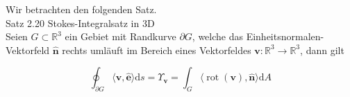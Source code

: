 \documentclass[10pt]{article}
\begin{document}
Wir betrachten den folgenden Satz.\\
Satz 2.20 Stokes-Integralsatz in 3D\\
Seien $G \subset \mathbb{R}^{3}$ ein Gebiet mit Randkurve $\partial G$, welche das Einheitsnormalen-Vektorfeld $\hat{\mathbf{n}}$ rechts umläuft im Bereich eines Vektorfeldes $\mathbf{v}: \mathbb{R}^{3} \rightarrow \mathbb{R}^{3}$, dann gilt


\begin{equation*}
\oint_{\partial G}\langle\mathbf{v}, \hat{\mathbf{e}}\rangle \mathrm{d} s=\Upsilon_{\mathbf{v}}=\int_{G}\langle\operatorname{rot}(\mathbf{v}), \hat{\mathbf{n}}\rangle \mathrm{d} A \tag{2.172}
\end{equation*}
\end{document}
